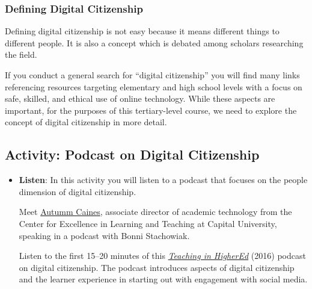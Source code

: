 \documentclass[
  letterpaper,
  DIV=11,
  numbers=noendperiod]{scrreprt}
\begin{document}
\subsubsection{Defining Digital
Citizenship}\label{defining-digital-citizenship}

Defining digital citizenship is not easy because it means different
things to different people. It is also a concept which is debated among
scholars researching the field.

If you conduct a general search for ``digital citizenship'' you will
find many links referencing resources targeting elementary and high
school levels with a focus on safe, skilled, and ethical use of online
technology. While these aspects are important, for the purposes of this
tertiary-level course, we need to explore the concept of digital
citizenship in more detail.

\subsection{Activity: Podcast on Digital
Citizenship}\label{activity-podcast-on-digital-citizenship}

\begin{tcolorbox}[enhanced jigsaw, toprule=.15mm, colback=white, colframe=quarto-callout-note-color-frame, bottomtitle=1mm, leftrule=.75mm, coltitle=black, titlerule=0mm, rightrule=.15mm, colbacktitle=quarto-callout-note-color!10!white, left=2mm, title={Learning Activity}, opacitybacktitle=0.6, opacityback=0, breakable, toptitle=1mm, arc=.35mm, bottomrule=.15mm]

\begin{itemize}
\item
  \textbf{Listen}: In this activity you will listen to a podcast that
  focuses on the people dimension of digital citizenship.

  Meet \href{https://autummcaines.com/}{Autumm Caines}, associate
  director of academic technology from the Center for Excellence in
  Learning and Teaching at Capital University, speaking in a podcast
  with Bonni Stachowiak.

  Listen to the first 15--20 minutes of this
  \href{https://teachinginhighered.com/podcast/digital-citizenship/}{\emph{Teaching
  in HigherEd}} (2016) podcast on digital citizenship. The podcast
  introduces aspects of digital citizenship and the learner experience
  in starting out with engagement with social media.
\end{itemize}

\end{tcolorbox}
\end{document}
